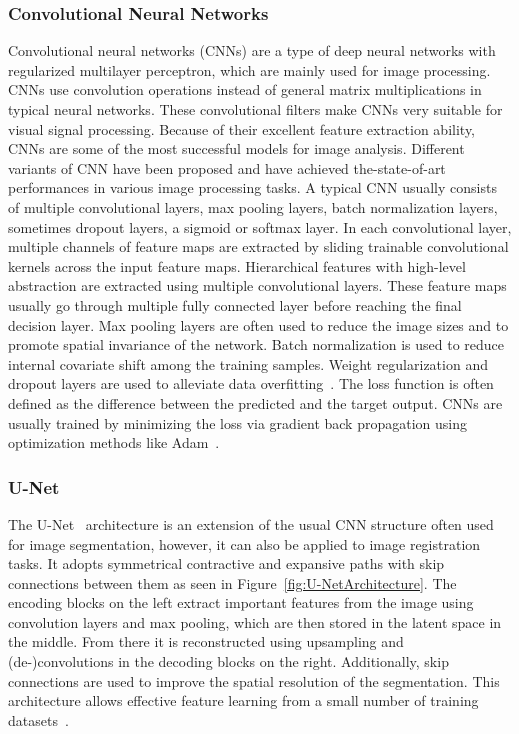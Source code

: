 \subsubsection{Convolutional Neural Networks} \label{SubSubSec:CNNs}
Convolutional neural networks (CNNs) are a type of deep neural networks with regularized multilayer perceptron, which are mainly used for image processing. CNNs use convolution operations instead of general matrix multiplications in typical neural networks. These convolutional filters make CNNs very suitable for visual signal processing. Because of their excellent feature extraction ability, CNNs are some of the most successful models for image analysis. Different variants of CNN have been proposed and have achieved the-state-of-art performances in various image processing tasks. A typical CNN usually consists of multiple convolutional layers, max pooling layers, batch normalization layers, sometimes dropout layers, a sigmoid or softmax layer. In each convolutional layer, multiple channels of feature maps are extracted by sliding trainable convolutional kernels across the input feature maps. Hierarchical features with high-level abstraction are extracted using multiple convolutional layers. These feature maps usually go through multiple fully connected layer before reaching the final decision layer. Max pooling layers are often used to reduce the image sizes and to promote spatial invariance of the network. Batch normalization is used to reduce internal covariate shift among the training samples. Weight regularization and dropout layers are used to alleviate data overfitting~\cite{Fu2020}. The loss function is often defined as the difference between the predicted and the target output. CNNs are usually trained by minimizing the loss via gradient back propagation using optimization methods like Adam~\cite{Adam}. %

\subsubsection{U-Net} \label{SubSubSec:U-Net}
The U-Net~\cite{U-Net} architecture is an extension of the usual CNN structure often used for image segmentation, however, it can also be applied to image registration tasks. It adopts symmetrical contractive and expansive paths with skip connections between them as seen in Figure~\ref{fig:U-NetArchitecture}. The encoding blocks on the left extract important features from the image using convolution layers and max pooling, which are then stored in the latent space in the middle. From there it is reconstructed using upsampling and (de-)convolutions in the decoding blocks on the right. Additionally, skip connections are used to improve the spatial resolution of the segmentation. This architecture allows effective feature learning from a small number of training datasets~\cite{Fu2020}. 

